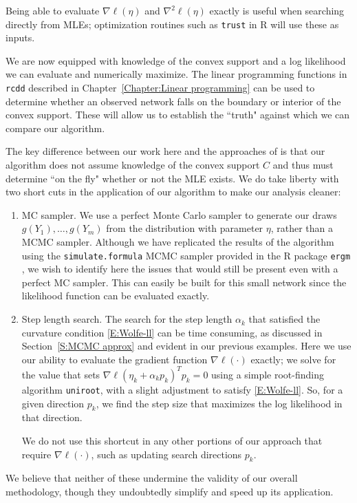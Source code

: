Being able to evaluate $\nabla \ell(\eta)$ and 
$\nabla^2 \ell(\eta)$ exactly is useful when searching directly from MLEs;
optimization routines such as \texttt{trust} \citep{trust:R} in R will use these
as inputs.  

We are now equipped with knowledge of the convex support and a log likelihood we 
can evaluate and numerically maximize.  The linear programming functions in 
\texttt{rcdd} described in Chapter~\ref{Chapter:Linear programming} 
can be used to determine whether an observed network falls on the boundary 
or interior of the convex support.  These will allow us to establish the ``truth" 
against which we can compare our algorithm.

The key difference between our work here and the approaches of 
\citep{Handcock:degeneracy,Rinaldo:2009} is that our algorithm does not assume
knowledge of the convex support $C$ and thus must determine ``on the fly" whether
or not the MLE exists.  
We do take liberty with two short cuts in the application of our algorithm to make 
our analysis cleaner:
\begin{enumerate}
\item MC sampler.  We use a perfect Monte Carlo sampler to generate our draws \\
$g(Y_1), \ldots, g(Y_m)$ from the distribution with parameter $\eta$, rather than a 
MCMC sampler.
Although we have replicated the results of the algorithm using the 
 \texttt{simulate.formula} MCMC sampler provided in the R package \texttt{ergm} 
 \citep{ergm:R}, we wish to identify here the 
issues that would still be present even with a perfect MC sampler.  This can 
easily be built for this small network since the likelihood function can be 
evaluated exactly.  


\item Step length search.  The search for the step length $\alpha_k$ that satisfied the 
curvature condition \eqref{E:Wolfe-ll} can be time consuming, as discussed in
Section~\ref{S:MCMC approx} and evident in our previous examples.
Here we use our ability to evaluate the gradient function $\nabla \ell(\cdot)$ exactly;  
we solve for the value that sets $\nabla \ell( \eta_k + \alpha_k p_k)^T p_k = 0$ 
using a simple root-finding algorithm \texttt{uniroot}, with a slight 
adjustment to satisfy \eqref{E:Wolfe-ll}.  So, for a given 
direction $p_k$, we find the step size that maximizes the log likelihood in that 
direction.

We do not use this shortcut in any other portions of our approach that 
require $\nabla \ell(\cdot)$, 
such as updating search directions $p_k$.

\end{enumerate}
We believe that neither of these undermine the validity of our overall methodology, 
though they undoubtedly simplify and speed up its application.


